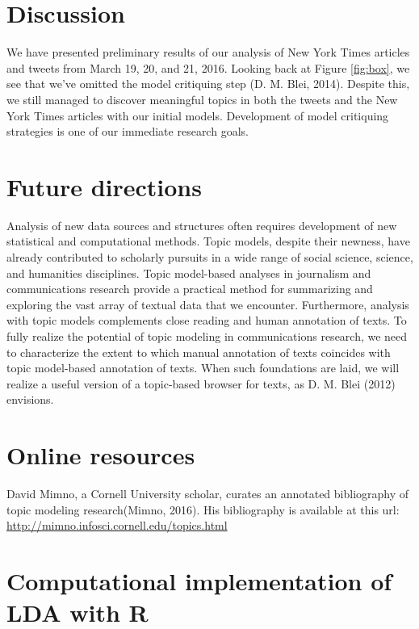 \documentclass[12pt,]{article}
\begin{document}
\section{Discussion}\label{discussion}

We have presented preliminary results of our analysis of New York Times
articles and tweets from March 19, 20, and 21, 2016. Looking back at
Figure \ref{fig:box}, we see that we've omitted the model critiquing
step (D. M. Blei, 2014). Despite this, we still managed to discover
meaningful topics in both the tweets and the New York Times articles
with our initial models. Development of model critiquing strategies is
one of our immediate research goals.

\section{Future directions}\label{future-directions}

Analysis of new data sources and structures often requires development
of new statistical and computational methods. Topic models, despite
their newness, have already contributed to scholarly pursuits in a wide
range of social science, science, and humanities disciplines. Topic
model-based analyses in journalism and communications research provide a
practical method for summarizing and exploring the vast array of textual
data that we encounter. Furthermore, analysis with topic models
complements close reading and human annotation of texts. To fully
realize the potential of topic modeling in communications research, we
need to characterize the extent to which manual annotation of texts
coincides with topic model-based annotation of texts. When such
foundations are laid, we will realize a useful version of a topic-based
browser for texts, as D. M. Blei (2012) envisions.

\section{Online resources}\label{online-resources}

David Mimno, a Cornell University scholar, curates an annotated
bibliography of topic modeling research(Mimno, 2016). His bibliography
is available at this url:
\url{http://mimno.infosci.cornell.edu/topics.html}

\section{Computational implementation of LDA with
R}\label{computational-implementation-of-lda-with-r}
\end{document}
